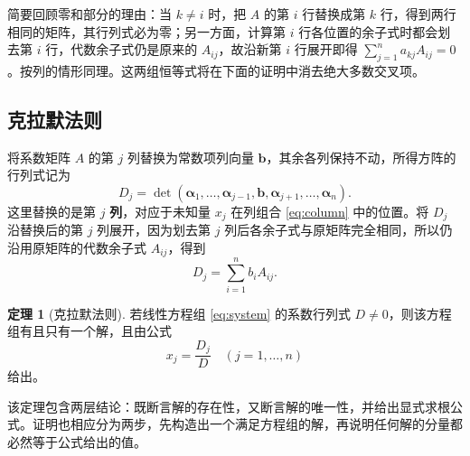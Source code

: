 \documentclass[UTF8, fontset=fandol, a4paper, 12pt]{ctexart}
\theoremstyle{definition}
\newtheorem{theorem}[definition]{定理}
\begin{document}
简要回顾零和部分的理由：当 $k\ne i$ 时，把 $A$ 的第 $i$ 行替换成第 $k$ 行，得到两行相同的矩阵，其行列式必为零；另一方面，计算第 $i$ 行各位置的余子式时都会划去第 $i$ 行，代数余子式仍是原来的 $A_{ij}$，故沿新第 $i$ 行展开即得 $\sum_{j=1}^n a_{kj}A_{ij}=0$。按列的情形同理。这两组恒等式将在下面的证明中消去绝大多数交叉项。

\subsection{克拉默法则}

将系数矩阵 $A$ 的第 $j$ 列替换为常数项列向量 $\boldsymbol b$，其余各列保持不动，所得方阵的行列式记为
\begin{equation}\label{eq:Dj}
 D_j=\det(\boldsymbol\alpha_1,\ldots,\boldsymbol\alpha_{j-1},
 \boldsymbol b,\boldsymbol\alpha_{j+1},\ldots,\boldsymbol\alpha_n).
\end{equation}
这里替换的是第 $j$ \textbf{列}，对应于未知量 $x_j$ 在列组合 \eqref{eq:column} 中的位置。将 $D_j$ 沿替换后的第 $j$ 列展开，因为划去第 $j$ 列后各余子式与原矩阵完全相同，所以仍沿用原矩阵的代数余子式 $A_{ij}$，得到
\begin{equation}\label{eq:Dj-expand}
 D_j=\sum_{i=1}^n b_iA_{ij}.
\end{equation}

\begin{theorem}[克拉默法则]
若线性方程组 \eqref{eq:system} 的系数行列式 $D\ne0$，则该方程组有且只有一个解，且由公式
\[
 \boxed{x_j=\frac{D_j}{D}\quad(j=1,\ldots,n)}
\]
给出。
\end{theorem}

该定理包含两层结论：既断言解的存在性，又断言解的唯一性，并给出显式求根公式。证明也相应分为两步，先构造出一个满足方程组的解，再说明任何解的分量都必然等于公式给出的值。
\end{document}

